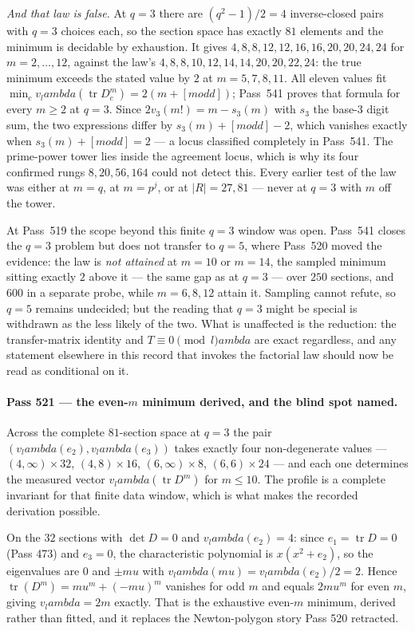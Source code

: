 \documentclass[12pt,a4paper]{article}
\def\mathbf#1{#1}%
\def\textbf#1{#1}%
\def\text#1{#1}%
\def\lambda{lambda}%
\def\mu{mu}%
\theoremstyle{definition}
\begin{document}
\emph{And that law is false.}  At $q=3$ there are $(q^2-1)/2=4$ inverse-closed
pairs with $q=3$ choices each, so the section space has exactly $81$ elements
and the minimum is decidable by exhaustion.  It gives
$4,8,8,\mathbf{12},12,\mathbf{16},\mathbf{16},20,20,\mathbf{24},24$ for
$m=2,\dots,12$, against the law's $4,8,8,10,12,14,14,20,20,22,24$: the true
minimum exceeds the stated value by $2$ at $m=5,7,8,11$.  All eleven values fit
$\min_c v_\lambda(\operatorname{tr}D_c^m)=2(m+[m\text{ odd}])$; Pass~541 proves that
formula for every $m\ge2$ at $q=3$.  Since
$2v_3(m!)=m-s_3(m)$ with $s_3$ the base-$3$ digit sum, the two expressions
differ by $s_3(m)+[m\text{ odd}]-2$, which vanishes exactly when
$s_3(m)+[m\text{ odd}]=2$ --- a locus classified completely in Pass~541.  \textbf{The
prime-power tower lies inside the agreement locus}, which is why its four
confirmed rungs $8,20,56,164$ could not detect this.  Every earlier test of the
law was either at $m=q$, at $m=p^{j}$, or at $|R|=27,81$ --- never at $q=3$ with
$m$ off the tower.

At Pass~519 the scope beyond this finite $q=3$ window was open.  Pass~541
closes the $q=3$ problem but does not transfer to $q=5$, where Pass~520 moved
the evidence: the law is \emph{not attained} at $m=10$ or $m=14$, the sampled minimum
sitting exactly $2$ above it --- the same gap as at $q=3$ --- over $250$
sections, and $600$ in a separate probe, while $m=6,8,12$ attain it.  Sampling
cannot refute, so $q=5$ remains undecided; but the reading that $q=3$ might be
special is withdrawn as the less likely of the two.  What is unaffected is the reduction: the transfer-matrix
identity and $T\equiv0\pmod\lambda$ are exact regardless, and any statement
elsewhere in this record that invokes the factorial law should now be read as
conditional on it.

\paragraph{Pass 521 --- the even-$m$ minimum derived, and the blind spot named.}
Across the complete $81$-section space at $q=3$ the pair
$(v_\lambda(e_2),v_\lambda(e_3))$ takes exactly four non-degenerate values ---
$(4,\infty)\times32$, $(4,8)\times16$, $(6,\infty)\times8$, $(6,6)\times24$ ---
and each one determines the measured vector
$v_\lambda(\operatorname{tr}D^m)$ for $m\le10$.  The profile is a complete
invariant for that finite data window, which is what makes the recorded
derivation possible.

On the $32$ sections with $\det D=0$ and $v_\lambda(e_2)=4$: since
$e_1=\operatorname{tr}D=0$ (Pass 473) and $e_3=0$, the characteristic
polynomial is $x(x^2+e_2)$, so the eigenvalues are $0$ and $\pm\mu$ with
$v_\lambda(\mu)=v_\lambda(e_2)/2=2$.  Hence
$\operatorname{tr}(D^m)=\mu^m+(-\mu)^m$ vanishes for odd $m$ and equals
$2\mu^m$ for even $m$, giving $v_\lambda=2m$ exactly.  \textbf{That is the
exhaustive even-$m$ minimum, derived rather than fitted}, and it replaces the
Newton-polygon story Pass 520 retracted.
\end{document}
